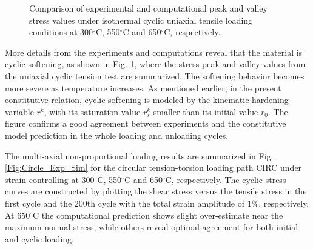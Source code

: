 \documentclass[preprint,5p,twocolumn,11pt,sort&compress]{elsarticle}
\begin{document}
\begin{figure}
\caption{Comparison of experimental and computational peak and valley stress values under isothermal cyclic uniaxial tensile loading conditions at 300$^{\circ}$C, 550$^{\circ}$C and 650$^{\circ}$C, respectively.}
\label{Fig:Compare_PACC-PV_stress_temperature}
\end{figure}


\begin{figure*}[!]
\caption{Comparison between experiments and computations  for the isothermal non-proportional cyclic loading path CIRC at  300, 550, 650$^{\circ}$C, respectively. (a) The first loading cycle. (b) The 200th cycle.}
\label{Fig:Circle_Exp_Sim}
\end{figure*}


More details from the experiments and computations reveal that the material is cyclic softening, as shown in Fig. \ref{Fig:Compare_PACC-PV_stress_temperature}, where the stress peak and valley values from the uniaxial cyclic tension test are summarized. The softening behavior becomes more severe as temperature increases.
As mentioned earlier, in the present constitutive relation, cyclic softening is modeled by the kinematic hardening variable $r^k$, with its saturation value $r_s^k$ smaller than its initial value $r_0$.
The figure confirms a good agreement between experiments and the constitutive model prediction in the whole loading and unloading cycles.


The multi-axial non-proportional loading results are summarized in Fig. \ref{Fig:Circle_Exp_Sim} for the circular tension-torsion loading path CIRC under strain controlling at 300$^{\circ}$C, 550$^{\circ}$C and 650$^{\circ}$C, respectively. The cyclic stress curves are constructed by plotting the shear stress versus the tensile stress in the first cycle and the 200th cycle with the total strain amplitude of $1\%$, respectively. At 650$^{\circ}$C the computational prediction shows slight over-estimate near the maximum normal stress, while others reveal optimal agreement for both initial and cyclic loading.
\end{document}
